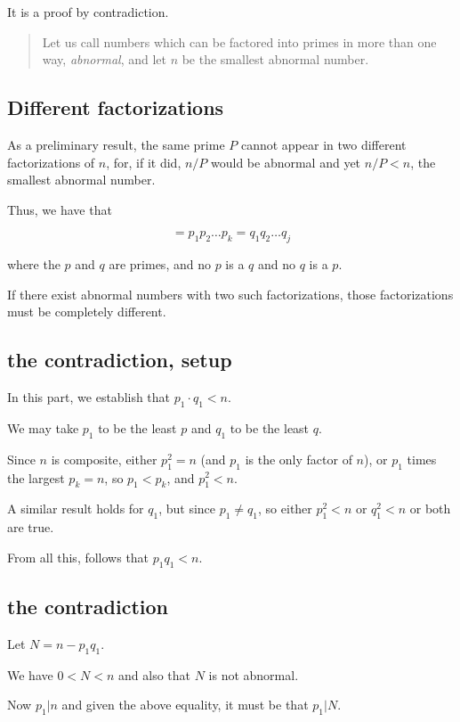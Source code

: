 \documentclass[11pt, oneside]{article}
\begin{document}
It is a proof by contradiction.

\begin{quote}Let us call numbers which can be factored into primes in more than one way, \emph{abnormal}, and let $n$ be the smallest abnormal number.\end{quote}

\subsection*{Different factorizations}

As a preliminary result, the same prime $P$ cannot appear in two different factorizations of $n$, for, if it did, $n/P$ would be abnormal and yet $n/P < n$, the smallest abnormal number.

Thus, we have that

\[  = p_1 p_2 \dots p_k = q_1 q_2 \dots q_j \]
    
where the $p$ and $q$ are primes, and no $p$ is a $q$ and no $q$ is a $p$.

If there exist abnormal numbers with two such factorizations, those factorizations must be completely different.

\subsection*{the contradiction, setup}

In this part, we establish that $p_1 \cdot q_1 < n$.

We may take $p_1$ to be the least $p$ and $q_1$ to be the least $q$.  

Since $n$ is composite, either $p_1^2 = n$ (and $p_1$ is the only factor of $n$), or $p_1$ times the largest $p_k = n$, so $p_1 < p_k$, and $p_1^2 < n$.

A similar result holds for $q_1$, but since $p_1 \ne q_1$, so either $p_1^2 < n$ or $q_1^2 < n$ or both are true.

From all this, follows that $p_1 q_1 < n$. 

\subsection*{the contradiction} 

Let $N = n - p_1 q_1$.

We have $0 < N < n$ and also that $N$ is not abnormal.

Now $p_1 | n$ and given the above equality, it must be that $p_1 | N$.
\end{document}
